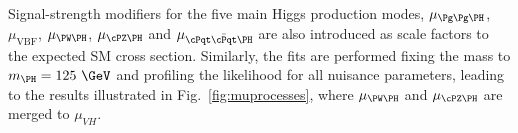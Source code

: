 Signal-strength modifiers for the five main Higgs production modes, $\mu_{\Pg\Pg\PH}$, $\mu_{\mathrm{VBF}}$, $\mu_{\WH}$, $\mu_{\ZH}$ and $\mu_{\ttH}$ are also introduced as scale factors to the expected SM cross section. 
Similarly, the fits are performed fixing the mass to $\mH = 125~\GeV$ and profiling the likelihood for all nuisance parameters, leading to the results 
illustrated in Fig.~\ref{fig:muprocesses},
where $\mu_{\WH}$ and  $\mu_{\ZH}$ are merged to $\mu_{VH}$.



